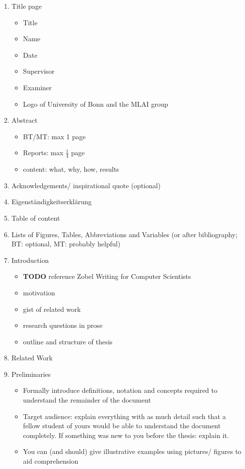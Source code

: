\documentclass[nodate]{proc}
\begin{document}
\begin{enumerate}
	\item Title page
		\begin{itemize}
			\item Title
			\item Name
			\item Date
			\item Supervisor
			\item Examiner
			\item Logo of University of Bonn and the MLAI group
		\end{itemize}
	\item Abstract
		\begin{itemize}
			\item BT/MT: max 1 page
			\item Reports: max $\frac{1}{4}$ page
			\item content: what, why, how, results
		\end{itemize}
	\item Acknowledgements/ inspirational quote (optional)
	\item Eigenständigkeitserklärung
	\item Table of content
	\item Lists of Figures, Tables, Abbreviations and Variables (or after bibliography; BT: optional, MT: probably helpful)
	\item Introduction
		\begin{itemize}
			\item \textbf{TODO} reference Zobel Writing for Computer Scientists \cite{zobel_writing}
			\item motivation
			\item gist of related work
			\item research questions in prose
			\item outline and structure of thesis
		\end{itemize}
	\item Related Work
	\item Preliminaries
		\begin{itemize}
			\item Formally introduce definitions, notation and concepts required to understand the remainder of the document
			\item Target audience: explain everything with as much detail such that a fellow student of yours would be able to understand the document completely. If something was new to you before the thesis: explain it.
			\item You can (and should) give illustrative examples using pictures/ figures to aid comprehension

\end{itemize}
\end{enumerate}
\end{document}
